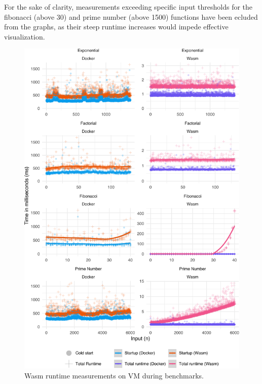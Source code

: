 \documentclass[
  table]{report}
\begin{document}
For the sake of clarity, measurements exceeding specific input
thresholds for the fibonacci (above 30) and prime number (above 1500)
functions have been ecluded from the graphs, as their steep runtime
increases would impede effective visualization.

\newpage

\begin{figure}[H]

{\centering \includegraphics{thesis_files/figure-latex/nrec-efficiency-1} 

}

\caption{Wasm runtime measurements on VM during benchmarks.\label{nrec-efficiency}}\label{fig:nrec-efficiency}
\end{figure}

\newpage
\end{document}
